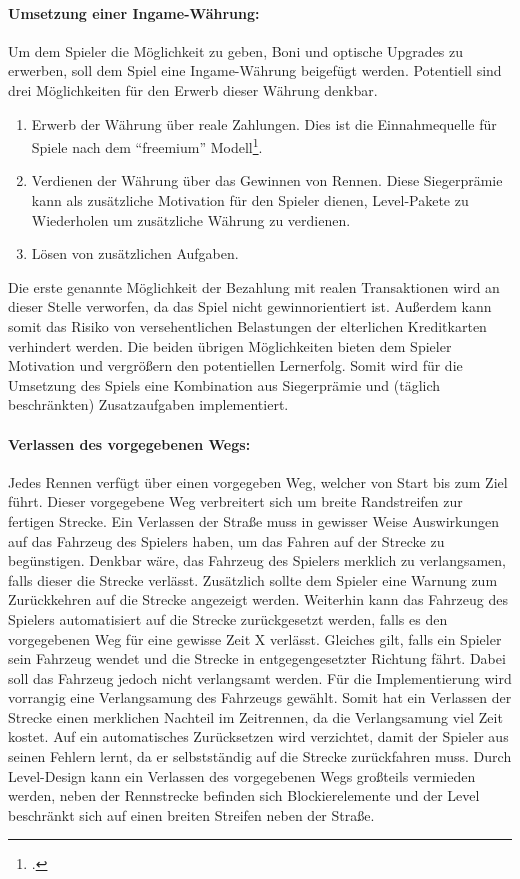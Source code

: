 		\paragraph{Umsetzung einer Ingame-Währung:}
		Um dem Spieler die Möglichkeit zu geben, Boni und optische Upgrades zu erwerben, soll dem Spiel eine Ingame-Währung beigefügt werden. Potentiell sind drei Möglichkeiten für den Erwerb dieser Währung denkbar.
		\begin{enumerate}
			\item{ Erwerb der Währung über reale Zahlungen. Dies ist die Einnahmequelle für Spiele nach dem \enquote{freemium} Modell\footcite[Seite 8]{freemium}. }
			\item{ Verdienen der Währung über das Gewinnen von Rennen. Diese Siegerprämie kann als zusätzliche Motivation für den Spieler dienen, Level-Pakete zu Wiederholen um zusätzliche Währung zu verdienen. }
			\item{ Lösen von zusätzlichen Aufgaben. }
		\end{enumerate}
		Die erste genannte Möglichkeit der Bezahlung mit realen Transaktionen wird an dieser Stelle verworfen, da das Spiel nicht gewinnorientiert ist. Außerdem kann somit das Risiko von versehentlichen Belastungen der elterlichen Kreditkarten verhindert werden.
		Die beiden übrigen Möglichkeiten bieten dem Spieler Motivation und vergrößern den potentiellen Lernerfolg. Somit wird für die Umsetzung des Spiels eine Kombination aus Siegerprämie und (täglich beschränkten) Zusatzaufgaben implementiert.

		\paragraph{Verlassen des vorgegebenen Wegs:}\label{par:streckendesign}
		Jedes Rennen verfügt über einen vorgegeben Weg, welcher von Start bis zum Ziel führt. Dieser vorgegebene Weg verbreitert sich um breite Randstreifen zur fertigen Strecke. Ein Verlassen der Straße muss in gewisser Weise Auswirkungen auf das Fahrzeug des Spielers haben, um das Fahren auf der Strecke zu begünstigen. Denkbar wäre, das Fahrzeug des Spielers merklich zu verlangsamen, falls dieser die Strecke verlässt. Zusätzlich sollte dem Spieler eine Warnung zum Zurückkehren auf die Strecke angezeigt werden. Weiterhin kann das Fahrzeug des Spielers automatisiert auf die Strecke zurückgesetzt werden, falls es den vorgegebenen Weg für eine gewisse Zeit X verlässt. Gleiches gilt, falls ein Spieler sein Fahrzeug wendet und die Strecke in entgegengesetzter Richtung fährt. Dabei soll das Fahrzeug jedoch nicht verlangsamt werden. Für die Implementierung wird vorrangig eine Verlangsamung des Fahrzeugs gewählt.
		Somit hat ein Verlassen der Strecke einen merklichen Nachteil im Zeitrennen, da die Verlangsamung viel Zeit kostet. Auf ein automatisches Zurücksetzen wird verzichtet, damit der Spieler aus seinen Fehlern lernt, da er selbstständig auf die Strecke zurückfahren muss. Durch Level-Design kann ein Verlassen des vorgegebenen Wegs großteils vermieden werden, neben der Rennstrecke befinden sich Blockierelemente und der Level beschränkt sich auf einen breiten Streifen neben der Straße.

